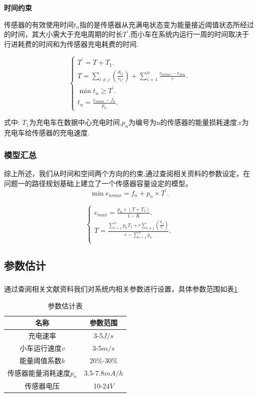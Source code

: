 \documentclass{whutmod}
\newcommand{\upcite}[1]{\textsuperscript{\textsuperscript{\cite{#1}}}}
\begin{document}
\textbf{时间约束}

传感器的有效使用时间$t_{n}$指的是传感器从充满电状态变为能量接近阈值状态所经过的时间，其大小需大于充电周期的时长$T^{\prime}$,而小车在系统内运行一周的时间取决于行进耗费的时间和为传感器充电耗费的时间.

\begin{equation}\left\{\begin{array}{l}
		T^{\prime}=T+T_{1} .\\
		T=\sum_{i\neq j}(\frac{d_{ij}}{v_{C}})+\sum_{i=1}^{n} \frac{e_{nmax}-e_{ncu}}{r}. \\	
		\min {t_{n}} \ge T^{\prime}.\\
		t_{n}=\frac{e_{nmax}-f_{n}}{p_{n}}.
	\end{array}\right.
\end{equation}

式中: $T_{1}$为充电车在数据中心充电时间,$p_{n}$为编号为n的传感器的能量损耗速度.\qquad r为充电车给传感器的充电速度.

\subsubsection{模型汇总}
综上所述，我们从时间和空间两个方向的约束,通过查阅相关资料的参数设定，在问题一的路径规划基础上建立了一个传感器容量设定的模型。
\begin{equation}
	\min e_{nmax}=f_{n}+p_{n}\times T^{\prime}.
\end{equation}

\begin{equation}\left\{\begin{array}{l}
		e_{max}=\frac {p_{n}\times (T+T_{1})}{1-K}.\\	
		T=\frac{\sum_{i=1}^{n}p_{n}T_{1}+r\sum_{i\neq j}(\frac{d_{ij}}{v_{c}})} {r-\sum_{i=1}^{n}p_{n}}.\\
		
	\end{array}\right.
\end{equation}

\subsection{参数估计}
通过查阅相关文献资料\upcite{bib:one}\upcite{bib:two}\upcite{bib:three}我们对系统内相关参数进行设置，具体参数范围如表\ref{canshu2}

\begin{table}[!htbp]
	\caption{参数估计表}\label{canshu2} \centering
	\begin{tabular}{cc}
		\toprule[1pt]
		名称 & 参数范围\\
		\midrule[1pt]
		充电速率& 3-5$J/s$\\
		小车运行速度$v$& 3-5$m/s$\\
		能量阈值系数$k$& 20\%-30\% \\
		传感器能量消耗速度$p_{n}$ &3.5-7.8$mA/h$ \\
		传感器电压&10-24$V$\\		
		\bottomrule[1.5pt]
	\end{tabular}
\end{table}
\end{document}
